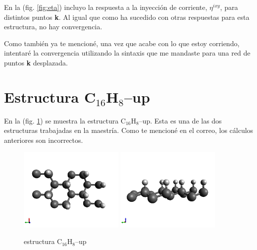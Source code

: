 \documentclass[11pt]{article}
\begin{document}
En la (fig. \ref{fig:eta}) incluyo la respuesta a la inyecci\'on de corriente, $\eta^{ixy}$, para distintos puntos \textbf{k}. Al igual que como ha sucedido con otras respuestas para esta estructura, no hay convergencia.


Como tambi\'en ya te mencion\'e, una vez que acabe con lo que estoy corriendo, intentar\'e la convergencia utilizando la sintaxis que me mandaste para una red de puntos \textbf{k} desplazada. 


\section{Estructura C$_{16}$H$_{8}$--up}

En la (fig. \ref{fig:up}) se muestra la estructura C$_{16}$H$_{8}$--up. Esta es una de las dos estructuras trabajadas en la maestr\'ia. Como te mencion\'e en el correo, los c\'alculos anteriores son incorrectos. 

\begin{figure}[h!]
	\begin{center}
		\includegraphics[width=0.45\textwidth]{./figures/up/c16h8_up-structure1}
		\includegraphics[width=0.45\textwidth]{./figures/up/c16h8_up-structure2}
	\end{center}
	\caption{estructura C$_{16}$H$_{8}$--up}
	\label{fig:up}
\end{figure}
\end{document}
